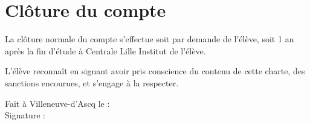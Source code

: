 \documentclass[12pt, a4paper]{article}
\begin{document}
\section{Clôture du compte}
La clôture normale du compte s'effectue soit par demande de l'élève, soit 1 an après la fin d'étude à Centrale Lille Institut de l'élève.

\vspace*{2cm}

\noindent L'élève reconnaît en signant avoir pris conscience du contenu de cette charte, des sanctions encourues, et s'engage à la respecter.

\vspace*{0.5cm}

\begin{flushright}
	\begin{minipage}{0.5\linewidth}
		Fait à Villeneuve-d'Ascq le : \dotfill\\
		Signature :
	\end{minipage}
\end{flushright}
\end{document}

